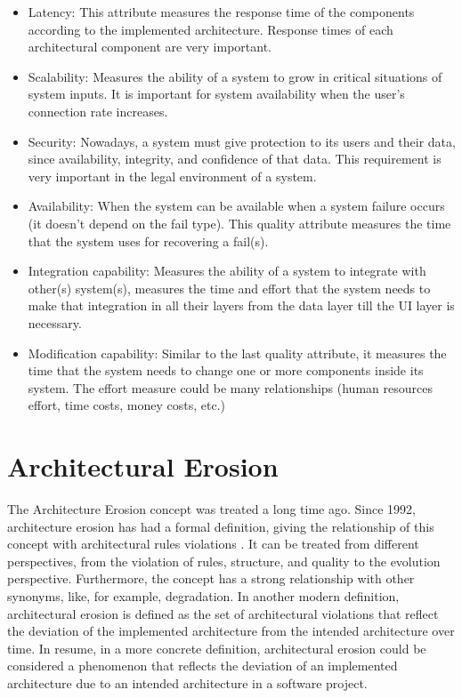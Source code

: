 \begin{itemize}
    \item Latency: This attribute measures the response time of the components according to the implemented architecture. Response times of each architectural component are very important.
    \item Scalability: Measures the ability of a system to grow in critical situations of system inputs. It is important for system availability when the user's connection rate increases.
    \item Security: Nowadays, a system must give protection to its users and their data, since availability, integrity, and confidence of that data. This requirement is very important in the legal environment of a system.
    \item Availability: When the system can be available when a system failure occurs (it doesn't depend on the fail type). This quality attribute measures the time that the system uses for recovering a fail(s).
    \item Integration capability: Measures the ability of a system to integrate with other(s) system(s), measures the time and effort that the system needs to make that integration in all their layers from the data layer till the UI layer is necessary.
    \item Modification capability: Similar to the last quality attribute, it measures the time that the system needs to change one or more components inside its system. The effort measure could be many relationships (human resources effort, time costs, money costs, etc.)
\end{itemize}


\section{Architectural Erosion}
The Architecture Erosion concept was treated a long time ago. Since 1992, architecture erosion has had a formal definition, giving the relationship of this concept with architectural rules violations \citet{perry-wolf-reference}. It can be treated from different perspectives, from the violation of rules, structure, and quality to the evolution perspective. Furthermore, the concept has a strong relationship with other synonyms, like, for example, degradation. In another modern definition, architectural erosion is defined as the set of architectural violations that reflect the deviation of the implemented architecture from the intended architecture over time. In resume, in a more concrete definition, architectural erosion could be considered a phenomenon that reflects the deviation of an implemented architecture due to an intended architecture in a software project.

